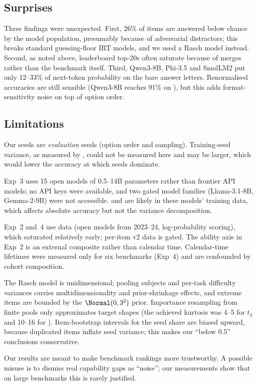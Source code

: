 \subsection{Surprises}

Three findings were unexpected. First, 26\% of \arcc items are answered below chance by the model population, presumably because of adversarial distractors; this breaks standard guessing-floor IRT models, and we used a Rasch model instead. Second, as noted above, leaderboard top-20s often saturate because of merges rather than the benchmark itself. Third, Qwen3-8B, Phi-3.5 and SmolLM2 put only 12--33\% of next-token probability on the bare answer letters. Renormalised accuracies are still sensible (\eg Qwen3-8B reaches 91\% on \arcc), but this adds format-sensitivity noise on top of option order.

\subsection{Limitations}
\label{sec:limitations}

 Our seeds are {\em evaluation} seeds (option order and sampling). Training-seed variance, as measured by \citet{madaan2024quantifying}, could not be measured here and may be larger, which would lower the accuracy at which seeds dominate.

 Exp~3 uses 15 open models of 0.5--14B parameters rather than frontier API models; no API keys were available, and two gated model families (Llama-3.1-8B, Gemma-2-9B) were not accessible. \arc and \mmlu are likely in these models' training data, which affects absolute accuracy but not the variance decomposition.

 Exp~2 and~4 use \leaderboard data (open models from 2023--24, log-probability scoring), which saturated relatively early; per-item v2 data is gated. The ability axis in Exp~2 is an external composite rather than calendar time. Calendar-time lifetimes were measured only for six benchmarks (Exp~4) and are confounded by cohort composition.

 The Rasch model is unidimensional; pooling \mmlu subjects and per-task difficulty variances carries multidimensionality and prior-shrinkage effects, and extreme items are bounded by the $\Normal(0, 3^2)$ prior. Importance resampling from finite pools only approximates target shapes (\eg the achieved kurtosis was 4--5 for $t_3$ and 10--16 for \lnhard). Item-bootstrap intervals for the seed share are biased upward, because duplicated items inflate seed variance; this makes our ``below 0.5'' conclusions conservative.

 Our results are meant to make benchmark rankings more trustworthy. A possible misuse is to dismiss real capability gaps as ``noise''; our measurements show that on large benchmarks this is rarely justified.
